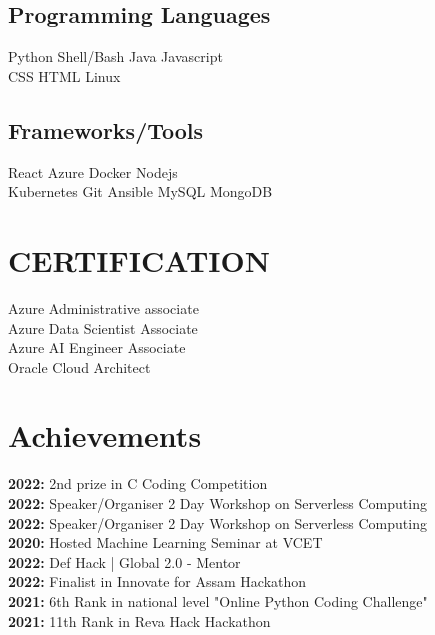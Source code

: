 \documentclass[]{Resume}
\begin{document}
\begin{minipage}[t]{0.33\textwidth}
\subsection{Programming Languages}
Python \textbullet{} Shell/Bash \textbullet{} Java \textbullet{} Javascript \\ 
CSS \textbullet{} HTML \textbullet{} Linux \\
\subsection{Frameworks/Tools}
React \textbullet{}Azure \textbullet{} Docker \textbullet{} Nodejs \\
\textbullet{}Kubernetes \textbullet{} Git \textbullet{} Ansible \textbullet{}  MySQL \textbullet{} MongoDB 
\sectionsep



\section{CERTIFICATION}

Azure Administrative associate\\
Azure Data Scientist Associate\\
Azure AI Engineer Associate\\
Oracle Cloud Architect\\
\sectionsep


\section{Achievements}
\textbf{2022:} 2nd prize in C Coding Competition\\
\textbf{2022:} Speaker/Organiser 2 Day Workshop on Serverless Computing\\
\textbf{2022:} Speaker/Organiser 2 Day Workshop on Serverless Computing\\
\textbf{2020:} Hosted Machine Learning Seminar at VCET\\
\textbf{2022:} Def Hack | Global 2.0 - Mentor\\
\textbf{2022:} Finalist in Innovate for Assam Hackathon\\
\textbf{2021:} 6th Rank in national level "Online Python Coding Challenge"\\
\textbf{2021:} 11th Rank in Reva Hack Hackathon\\
\sectionsep


\end{minipage}
\end{document}
